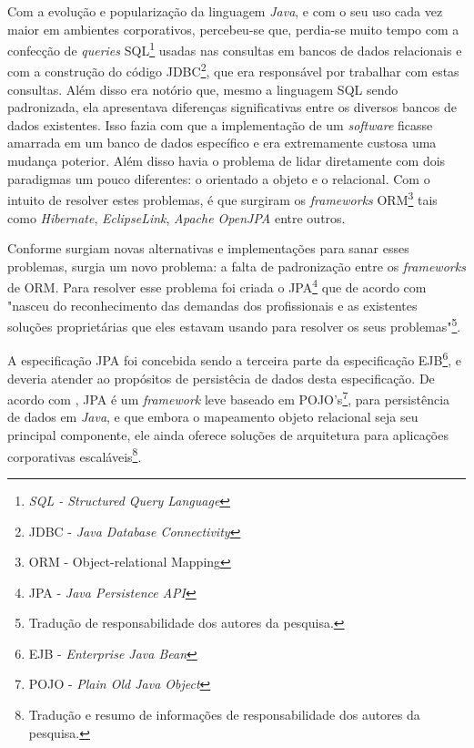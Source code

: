 
	\par Com a evolução e popularização da linguagem \textit{Java}, e com o seu
uso cada vez maior em ambientes corporativos, percebeu-se que, perdia-se muito
tempo com a confecção de \textit{queries} SQL\footnote{\textit{SQL - Structured
Query Language}} usadas nas consultas em bancos de dados relacionais e com a
construção do código JDBC\footnote{JDBC - \textit{Java Database Connectivity}},
que era responsável por trabalhar com estas consultas. Além disso era notório
que, mesmo a linguagem SQL sendo padronizada, ela apresentava diferenças
significativas entre os diversos bancos de dados existentes. Isso fazia com que
a implementação de um \textit{software} ficasse amarrada em um banco de dados
específico e era extremamente custosa uma mudança poterior. Além disso havia o
problema de lidar diretamente com dois paradigmas um pouco diferentes: o
orientado a objeto e o relacional. Com o intuito de resolver estes problemas, é
que surgiram os \textit{frameworks} ORM\footnote{ORM - Object-relational
Mapping} tais como \textit{Hibernate}, \textit{EclipseLink}, \textit{Apache
OpenJPA} entre outros.

	\par Conforme surgiam novas alternativas e implementações para sanar esses
problemas, surgia um novo problema: a falta de padronização entre os
\textit{frameworks} de ORM. Para resolver esse problema foi criada o
JPA\footnote{JPA - \textit{Java Persistence API}} que de acordo com
 "nasceu do reconhecimento das demandas dos
profissionais e as existentes soluções proprietárias que eles estavam usando
para resolver os seus problemas"\footnote{Tradução de responsabilidade dos
autores da pesquisa.}. 
	
	\par A especificação JPA foi concebida sendo a terceira parte da
especificação EJB\footnote{EJB - \textit{Enterprise Java Bean}}, e deveria
atender ao propósitos de persistêcia de dados desta especificação.
De acordo com , JPA é um \textit{framework} leve
baseado em POJO's\footnote{POJO - \textit{Plain Old Java Object }}, para
persistência de dados em \textit{Java}, e que embora o mapeamento objeto
relacional seja seu principal componente, ele ainda oferece soluções de
arquitetura para aplicações corporativas escaláveis\footnote{Tradução e resumo
de informações de responsabilidade dos autores da pesquisa.}.

